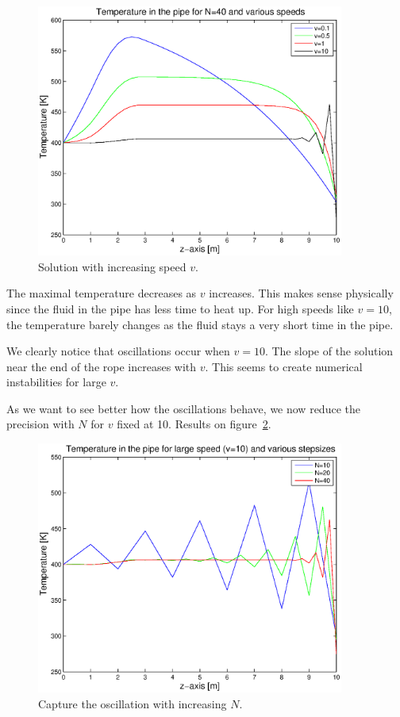 \documentclass[11pt,a4paper]{report}
\begin{document}
\begin{figure}[!h]
\centering
\includegraphics[width = 0.9\textwidth]{./fig2.eps}
\caption{Solution with increasing speed $v$.}
\label{fig:2}
\end{figure}

The maximal temperature decreases as $v$ increases. This makes sense physically since the fluid in the pipe has less time to heat up. For high speeds like $v=10$, the temperature barely changes as the fluid stays a very short time in the pipe.

We clearly notice that oscillations occur when $v=10$. 
The slope of the solution near the end of the rope increases with $v$. This seems to create numerical instabilities for large $v$.


As we want to see better how the oscillations behave, we now reduce the precision with $N$ for $v$ fixed at 10. Results on figure~\ref{fig:3}.

\begin{figure}[!h]
\centering
\includegraphics[width = 0.9\textwidth]{./fig3.eps}
\caption{Capture the oscillation with increasing $N$.}
\label{fig:3}
\end{figure}
\end{document}
